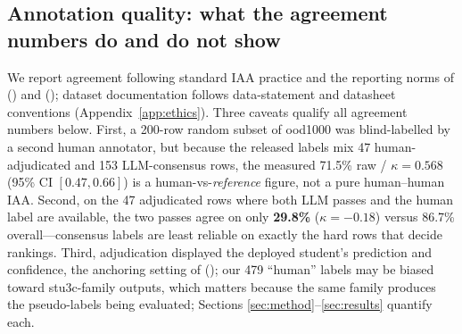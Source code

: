 \subsection{Annotation quality: what the agreement numbers do and do not show}

We report agreement following standard IAA practice
\citep{artstein2008} and the reporting norms of
\citeauthor{kunilovskaya2026} (\citeyear{kunilovskaya2026}) and
\citeauthor{alkhalifa2026} (\citeyear{alkhalifa2026}); dataset
documentation follows data-statement and datasheet conventions
\citep{bender2018,gebru2021} (Appendix~\ref{app:ethics}). Three
caveats qualify all agreement numbers below. First, a 200-row random
subset of ood1000 was blind-labelled by a second human annotator, but
because the released labels mix 47 human-adjudicated and 153
LLM-consensus rows, the measured 71.5\% raw / $\kappa=0.568$ (95\% CI
$[0.47,0.66]$) is a human-vs-\emph{reference} figure, not a pure
human--human IAA. Second, on the 47 adjudicated rows where both LLM
passes and the human label are available, the two passes agree on only
\textbf{29.8\%} ($\kappa=-0.18$) versus 86.7\% overall---consensus
labels are least reliable on exactly the hard rows that decide
rankings. Third, adjudication displayed the deployed student's
prediction and confidence, the anchoring setting of
\citeauthor{schroeder2025humanloop} (\citeyear{schroeder2025humanloop});
our 479 ``human'' labels may be biased toward stu3c-family outputs,
which matters because the same family produces the pseudo-labels being
evaluated; Sections \ref{sec:method}--\ref{sec:results} quantify each.
